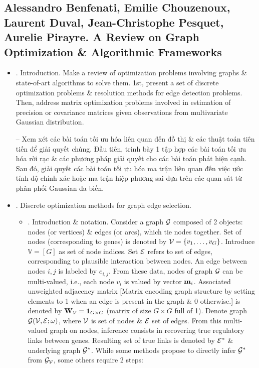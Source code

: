 \documentclass{article}
\begin{document}

\subsection{{\sc Alessandro Benfenati, Emilie Chouzenoux, Laurent Duval, Jean-Christophe Pesquet, Aurelie Pirayre}. A Review on Graph Optimization \& Algorithmic Frameworks}

\begin{itemize}
    \item {. Introduction.} Make a review of optimization problems involving graphs \& state-of-art algorithms to solve them. 1st, present a set of discrete optimization problems \& resolution methods for edge detection problems. Then, address matrix optimization problems involved in estimation of precision or covariance matrices given observations from multivariate Gaussian distribution.
    
    -- Xem xét các bài toán tối ưu hóa liên quan đến đồ thị \& các thuật toán tiên tiến để giải quyết chúng. Đầu tiên, trình bày 1 tập hợp các bài toán tối ưu hóa rời rạc \& các phương pháp giải quyết cho các bài toán phát hiện cạnh. Sau đó, giải quyết các bài toán tối ưu hóa ma trận liên quan đến việc ước tính độ chính xác hoặc ma trận hiệp phương sai dựa trên các quan sát từ phân phối Gaussian đa biến.
    \item {. Discrete optimization methods for graph edge selection.}
    \begin{itemize}
        \item {. Introduction \& notation.} Consider a graph ${\cal G}$ composed of 2 objects: nodes (or vertices) \& edges (or arcs), which tie nodes together. Set of nodes (corresponding to genes) is denoted by ${\cal V} = \{v_1,\ldots,v_G\}$. Introduce $\mathbb{V} = [G]$ as set of node indices. Set ${\cal E}$ refers to set of edges, corresponding to plausible interaction between nodes. An edge between nodes $i,j$ is labeled by $e_{i,j}$. From these data, nodes of graph ${\cal G}$ can be multi-valued, i.e., each node $v_i$ is valued by vector ${\bf m}_i$. Associated unweighted adjacency matrix [Matrix encoding graph structure by setting elements to 1 when an edge is present in the graph \& 0 otherwise.] is denoted by ${\bf W}_{\cal V} = {\bf1}_{G\times G}$ (matrix of size $G\times G$ full of 1). Denote graph ${\cal G}({\cal V},{\cal E};\omega)$, where ${\cal V}$ is set of nodes \& ${\cal E}$ set of edges. From this multi-valued graph on nodes, inference consists in recovering true regulatory links between genes. Resulting set of true links is denoted by ${\cal E}^*$ \& underlying graph ${\cal G}^*$. While some methods propose to directly infer ${\cal G}^*$ from ${\cal G}_{\cal V}$, some others require 2 steps:
        

\end{itemize}
\end{itemize}
\end{document}
